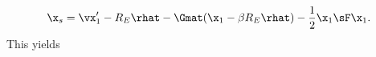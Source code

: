 \begin{equation}
\x_s = \vx'_1 - R_E \rhat - \Gmat(\x_1 - \beta R_E \rhat) - \frac{1}{2} \x_1 \sF \x_1.
\end{equation}
This yields
  